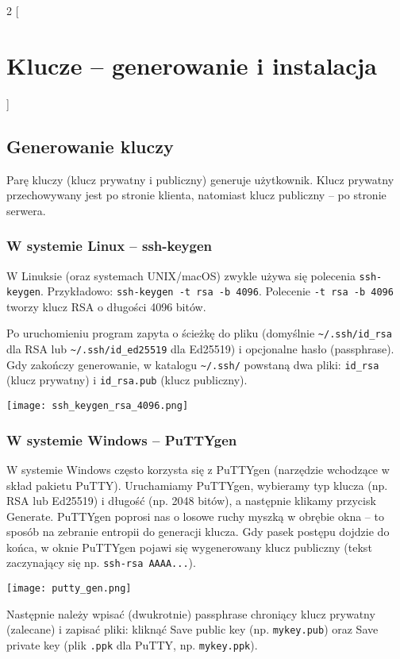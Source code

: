 \documentclass{article}
\begin{document}
\newpage
\begin{multicols}{2}
[
\section{Klucze -- generowanie i instalacja}
]
\subsection{Generowanie kluczy}
Parę kluczy (klucz prywatny i publiczny) generuje użytkownik. Klucz prywatny przechowywany jest po stronie klienta, natomiast klucz publiczny -- po stronie serwera.

\subsubsection{W systemie Linux -- ssh-keygen}
W Linuksie (oraz systemach UNIX/macOS) zwykle używa się polecenia \verb|ssh-keygen|. Przykładowo:
\verb|ssh-keygen -t rsa -b 4096|. Polecenie \verb|-t rsa -b 4096| tworzy klucz RSA o długości 4096 bitów\cite{sshkeygen}. 

Po uruchomieniu program zapyta o ścieżkę do pliku (domyślnie \verb|~/.ssh/id_rsa| dla RSA lub \verb|~/.ssh/id_ed25519| dla Ed25519) i opcjonalne hasło (passphrase). Gdy zakończy generowanie, w katalogu \verb|~/.ssh/| powstaną dwa pliki: \verb|id_rsa| (klucz prywatny) i \verb|id_rsa.pub| (klucz publiczny).

\noindent
\texttt{[image: ssh\_keygen\_rsa\_4096.png]}

\subsubsection{W systemie Windows -- PuTTYgen}
W systemie Windows często korzysta się z PuTTYgen (narzędzie wchodzące w skład pakietu PuTTY). Uruchamiamy PuTTYgen, wybieramy typ klucza (np. RSA lub Ed25519) i długość (np. 2048 bitów), a następnie klikamy przycisk Generate. PuTTYgen poprosi nas o losowe ruchy myszką w obrębie okna -- to sposób na zebranie entropii do generacji klucza. Gdy pasek postępu dojdzie do końca, w oknie PuTTYgen pojawi się wygenerowany klucz publiczny (tekst zaczynający się np. \verb|ssh-rsa AAAA...|). 

\noindent
\texttt{[image: putty\_gen.png]}

Następnie należy wpisać (dwukrotnie) passphrase chroniący klucz prywatny (zalecane) i zapisać pliki: kliknąć Save public key (np. \verb|mykey.pub|) oraz Save private key (plik \verb|.ppk| dla PuTTY, np. \verb|mykey.ppk|).


\end{multicols}
\end{document}
